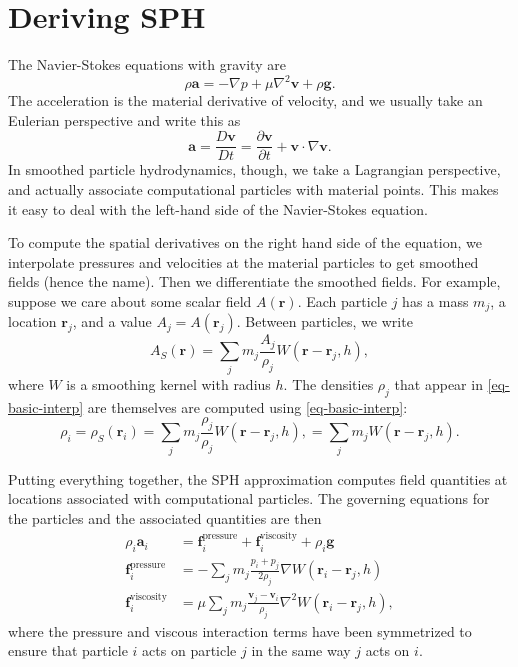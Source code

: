 \documentclass[10pt, leqno]{article} %
\newcommand{\bfr}{\mathbf{r}}
\newcommand{\bfv}{\mathbf{v}}
\newcommand{\bfa}{\mathbf{a}}
\newcommand{\bff}{\mathbf{f}}
\newcommand{\bfg}{\mathbf{g}}
\begin{document}
\pagestyle{fancy}
\fancyfoot{}

\section{Deriving SPH}

The Navier-Stokes equations with gravity are
\[
  \rho \bfa = -\nabla p + \mu \nabla^2 \bfv + \rho \bfg.
\]
The acceleration is the material derivative of velocity, and we
usually take an Eulerian perspective and write this as
\[
  \bfa 
  = \frac{D\bfv}{Dt}
  = \frac{\partial \bfv}{\partial t} + \bfv \cdot \nabla \bfv.
\]
In smoothed particle hydrodynamics, though, we take a Lagrangian
perspective, and actually associate computational particles with
material points.  This makes it easy to deal with the left-hand side
of the Navier-Stokes equation.

To compute the spatial derivatives on the right hand side of the
equation, we interpolate pressures and velocities at the material
particles to get smoothed fields (hence the name).  Then we
differentiate the smoothed fields.
For example, suppose we care about some scalar field $A(\bfr)$.
Each particle $j$ has a mass $m_j$, a location $\bfr_j$, and
a value $A_j = A(\bfr_j)$.  Between particles, we write
\begin{equation} \label{eq-basic-interp}
  A_S(\bfr) = \sum_{j} m_j \frac{A_j}{\rho_j} W(\bfr - \bfr_j, h),
\end{equation}
where $W$ is a smoothing kernel with radius $h$.  The densities
$\rho_j$ that appear in \eqref{eq-basic-interp} are themselves are 
computed using \eqref{eq-basic-interp}:
\[
  \rho_i 
  = \rho_S(\bfr_i) 
  = \sum_{j} m_j \frac{\rho_j}{\rho_j} W(\bfr - \bfr_j, h),
  = \sum_{j} m_j W(\bfr - \bfr_j, h).
\]

Putting everything together, the SPH approximation computes field
quantities at locations associated with computational particles.
The governing equations for the particles and the associated quantities
are then
\begin{align}
  \rho_i \bfa_i &= 
    \bff_i^{\mathrm{pressure}} + 
    \bff_i^{\mathrm{viscosity}} + \rho_i \bfg 
    \label{eq-particle-evolve} \\
  \bff_i^{\mathrm{pressure}}  &= 
    -\sum_j m_j \frac{p_i+p_j}{2 \rho_j} \nabla W(\bfr_i-\bfr_j, h) 
    \label{eq-pressure-force} \\
  \bff_i^{\mathrm{viscosity}} &=
    \mu \sum_j m_j \frac{\bfv_j-\bfv_i}{\rho_j} \nabla^2 W(\bfr_i-\bfr_j, h),
    \label{eq-viscous-force}
\end{align}
where the pressure and viscous interaction terms have been symmetrized to
ensure that particle $i$ acts on particle $j$ in the same way $j$ acts on $i$.
\end{document}
